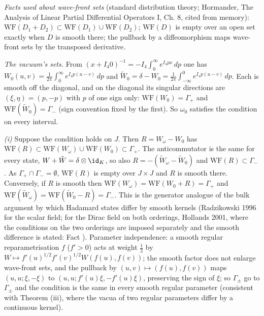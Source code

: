 \emph{Facts used about wave-front sets} (standard distribution theory; Hormander, The Analysis of Linear Partial Differential Operators I, Ch. 8, cited from memory): $\mathrm{WF}(D_{1} + D_{2}) \subset \mathrm{WF}(D_{1}) \cup \mathrm{WF}(D_{2})$; $\mathrm{WF}(D)$ is empty over an open set exactly when $D$ is smooth there; the pullback by a diffeomorphism maps wave-front sets by the transposed derivative.

\emph{The vacuum's sets.} From $(x + I_{4}0)^{-1} = -I_{4}\int_{0}^{\infty}e^{I_{4}px}\,dp$ one has $W_{0}(u, v) = \tfrac{1}{2\pi}\int_{0}^{\infty}e^{I_{4}p(u - v)}\,dp$ and $\tilde W_{0} = \delta - W_{0} = \tfrac{1}{2\pi}\int_{-\infty}^{0}e^{I_{4}p(u - v)}\,dp$. Each is smooth off the diagonal, and on the diagonal its singular directions are $(\xi, \eta) = (p, -p)$ with $p$ of one sign only: $\mathrm{WF}(W_{0}) = \Gamma_{+}$ and $\mathrm{WF}(\tilde W_{0}) = \Gamma_{-}$ (sign convention fixed by the first). So $\omega_{0}$ satisfies the condition on every interval.

\emph{(i)} Suppose the condition holds on $J$. Then $R = W_{\omega} - W_{0}$ has $\mathrm{WF}(R) \subset \mathrm{WF}(W_{\omega}) \cup \mathrm{WF}(W_{0}) \subset \Gamma_{+}$. The anticommutator is the same for every state, $W + \tilde W = \delta\otimes\id_{K}$, so also $R = -(\tilde W_{\omega} - \tilde W_{0})$ and $\mathrm{WF}(R) \subset \Gamma_{-}$. As $\Gamma_{+} \cap \Gamma_{-} = \emptyset$, $\mathrm{WF}(R)$ is empty over $J \times J$ and $R$ is smooth there. Conversely, if $R$ is smooth then $\mathrm{WF}(W_{\omega}) = \mathrm{WF}(W_{0} + R) = \Gamma_{+}$ and $\mathrm{WF}(\tilde W_{\omega}) = \mathrm{WF}(\tilde W_{0} - R) = \Gamma_{-}$. This is the generator analogue of the bulk argument by which Hadamard states differ by smooth kernels (Radzikowski 1996 for the scalar field; for the Dirac field on both orderings, Hollands 2001, where the conditions on the two orderings are imposed separately and the smooth difference is stated: Fact ). Parameter independence: a smooth regular reparametrisation $f$ ($f' > 0$) acts at weight $\tfrac12$ by $W \mapsto f'(u)^{1/2}f'(v)^{1/2}W(f(u), f(v))$; the smooth factor does not enlarge wave-front sets, and the pullback by $(u, v) \mapsto (f(u), f(v))$ maps $(u, u; \xi, -\xi)$ to $(u, u; f'(u)\xi, -f'(u)\xi)$, preserving the sign of $\xi$; so $\Gamma_{\pm}$ go to $\Gamma_{\pm}$ and the condition is the same in every smooth regular parameter (consistent with Theorem (iii), where the vacua of two regular parameters differ by a continuous kernel).


